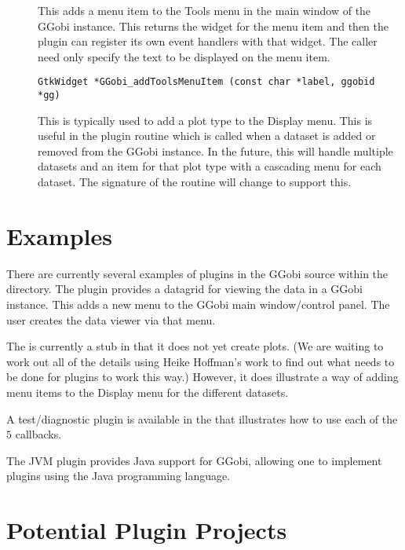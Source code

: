 \documentclass{article}
\begin{document}
\begin{description}
\item[]
This adds a menu item to the Tools menu in the main
window of the GGobi instance.
This returns the widget for the menu item and
then the plugin can register its own event handlers
with that widget.
The caller need only specify the text to be displayed
on the menu item.
\begin{verbatim}
GtkWidget *GGobi_addToolsMenuItem (const char *label, ggobid *gg)
\end{verbatim}

\item[] This is typically used to
add a plot type to the Display menu.  This is useful in the
 plugin routine which is called when a
dataset is added or removed from the GGobi instance.  In the future,
this will handle multiple datasets and an item for that plot type with
a cascading menu for each dataset.  The signature of the routine will
change to support this.
\end{description}



\section{Examples}

There are currently several examples of plugins in the GGobi source
within the  directory.  The  plugin
provides a datagrid for viewing the data in a GGobi instance.  This
adds a new menu to the GGobi main window/control panel.  The user
creates the data viewer via that menu.

The  is currently a stub in that it does not yet
create plots. (We are waiting to work out all of the details using
Heike Hoffman's work to find out what needs to be done for plugins to
work this way.) However, it does illustrate a way of adding menu items
to the Display menu for the different datasets.

A test/diagnostic plugin is available in the 
that illustrates how to use each of the $5$ callbacks.

The JVM plugin provides Java support for GGobi, allowing one to
implement plugins using the Java programming language.

\section{Potential Plugin Projects}
\end{document}
